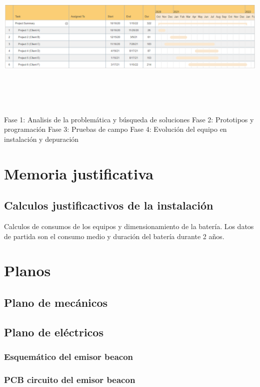 \documentclass[a4paper ,12pt, onecolumn]{article}
\begin{document}
        \paragraph{}
        \includegraphics[width=15cm, height=8cm]{gantt.PNG}
        Fase 1: Analisis de la problemática y búsqueda de soluciones
        Fase 2: Prototipos y programación
        Fase 3: Pruebas de campo
        Fase 4: Evolución del equipo en instalación y depuración 
\section{Memoria justificativa}
    \subsection{Calculos justificactivos de la instalación}
        Calculos de consumos de los equipos y dimensionamiento de la batería.
        Los datos de partida son el consumo medio y duración del batería durante 2 años.
\section{Planos}
    \subsection{Plano de mecánicos}
    \subsection{Plano de eléctricos}
        \subsubsection{Esquemático del emisor beacon}
        \subsubsection{PCB circuito del emisor beacon}
\end{document}
